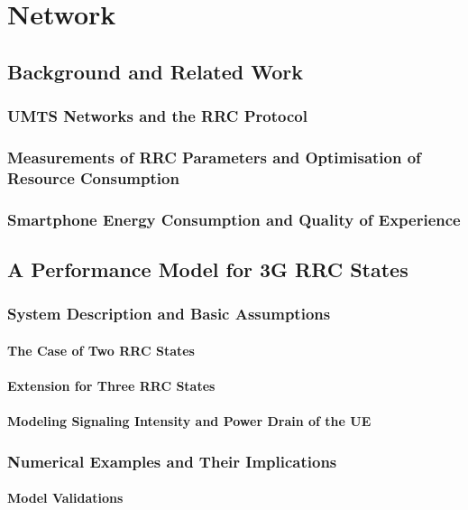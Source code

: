 \chapter{Network}\label{chap:network}

\section{Background and Related Work}
\subsection{UMTS Networks and the RRC Protocol}
\subsection{Measurements of RRC Parameters and Optimisation of
Resource Consumption}
\subsection{Smartphone Energy Consumption and Quality of Experience}

\section{A Performance Model for 3G RRC States}
\cite{Schwartz2013c}
\subsection{System Description and Basic Assumptions}
\subsubsection*{The Case of Two RRC States}
\subsubsection*{Extension for Three RRC States}
\subsubsection*{Modeling Signaling Intensity and Power Drain of the UE}

\subsection{Numerical Examples and Their Implications}
\subsubsection*{Model Validations}
